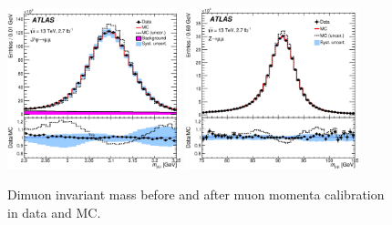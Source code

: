 \begin{figure}[htb]
  \begin{center}
    \includegraphics[width=0.45\textwidth]{figures/MuonReco/JPsiMass.eps}\hspace{0.05\textwidth}
    \includegraphics[width=0.45\textwidth]{figures/MuonReco/ZMass.eps}\hspace{0.05\textwidth}
\end{center}
\caption{Dimuon invariant mass before and after muon momenta calibration in data and MC.\cite{MuonReco}}
\label{fig:muonCalib} 
\end{figure}